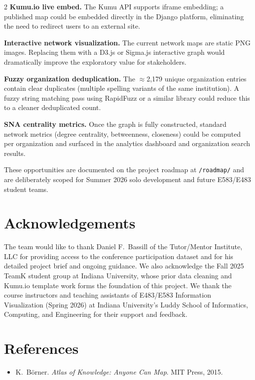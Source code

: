 \documentclass[11pt,letterpaper]{article}
\begin{document}
\begin{multicols}{2}
\textbf{Kumu.io live embed.} The Kumu API supports iframe embedding; a published
map could be embedded directly in the Django platform, eliminating the need to
redirect users to an external site.

\textbf{Interactive network visualization.} The current network maps are static
PNG images. Replacing them with a D3.js or Sigma.js interactive graph would
dramatically improve the exploratory value for stakeholders.

\textbf{Fuzzy organization deduplication.} The ${\approx}$2,179 unique
organization entries contain clear duplicates (multiple spelling variants of the
same institution). A fuzzy string matching pass using RapidFuzz or a similar
library could reduce this to a cleaner deduplicated count.

\textbf{SNA centrality metrics.} Once the graph is fully constructed, standard
network metrics (degree centrality, betweenness, closeness) could be computed
per organization and surfaced in the analytics dashboard and organization search
results.

These opportunities are documented on the project roadmap at \texttt{/roadmap/}
and are deliberately scoped for Summer 2026 solo development and future
E583/E483 student teams.

\section*{Acknowledgements}

The team would like to thank Daniel F.\ Bassill of the Tutor/Mentor Institute,
LLC for providing access to the conference participation dataset and for his
detailed project brief and ongoing guidance. We also acknowledge the Fall 2025
TeamK student group at Indiana University, whose prior data cleaning and
Kumu.io template work forms the foundation of this project. We thank the course
instructors and teaching assistants of E483/E583 Information Visualization
(Spring 2026) at Indiana University's Luddy School of Informatics, Computing,
and Engineering for their support and feedback.

\section*{References}

\begin{itemize}[leftmargin=*, label={}, itemsep=2pt]
  \item K.\ B\"{o}rner. \textit{Atlas of Knowledge: Anyone Can Map}. MIT Press, 2015.


\end{itemize}
\end{multicols}
\end{document}

